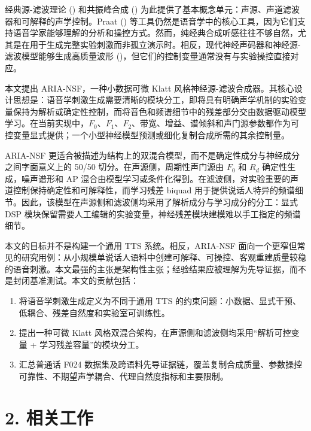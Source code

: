经典源-滤波理论 ()
和共振峰合成 ()
为此提供了基本概念单元：声源、声道滤波器和可解释的声学控制。Praat
()
等工具仍然是语音学中的核心工具，因为它们支持语音学家能够理解的分析和操控方式。然而，纯经典合成听感往往不够自然，尤其是在用于生成完整实验刺激而非孤立演示时。相反，现代神经声码器和神经源-滤波模型能够生成高质量波形
()，但它们的控制变量通常没有与实验操控直接对应。

本文提出 ARIA-NSF，一种小数据可微 Klatt
风格神经源-滤波合成器。其核心设计思想是：语音学刺激生成需要清晰的模块分工，即将具有明确声学机制的实验变量保持为解析或确定性控制，而将音色和频谱细节中的残差部分交由数据驱动模型学习。在当前实现中，\(F_0\)、\(F_1\)、\(F_2\)、带宽、增益、谱倾斜和声门源参数都作为可控变量显式提供；一个小型神经模型预测或细化复制合成所需的其余控制量。

ARIA-NSF
更适合被描述为结构上的双混合模型，而不是确定性成分与神经成分之间字面意义上的
50/50 切分。在声源侧，周期性声门源由 \(F_0\) 和 \(R_d\)
确定性生成，噪声谱形和 AP
混合由模型学习或条件化得到。在滤波侧，对实验重要的声道控制保持确定性和可解释性，而学习残差
biquad
用于提供说话人特异的频谱细节。因此，该模型在声源侧和滤波侧均采用了解析成分与学习成分的分工：显式
DSP
模块保留需要人工编辑的实验变量，神经残差模块建模难以手工指定的频谱细节。

本文的目标并不是构建一个通用 TTS 系统。相反，ARIA-NSF
面向一个更窄但常见的研究用例：从小规模单说话人语料中创建可解释、可操控、客观重建质量较稳的语音刺激。本文最强的主张是架构性主张；经验结果应被理解为先导证据，而不是封闭基准测试。本文的贡献包括：

\begin{enumerate}
\def\labelenumi{\arabic{enumi}.}
\tightlist
\item
  将语音学刺激生成定义为不同于通用 TTS
  的约束问题：小数据、显式干预、低耦合、残差自然度和实验室可训练性。
\item
  提出一种可微 Klatt
  风格双混合架构，在声源侧和滤波侧均采用``解析可控变量 +
  学习残差容量''的模块分工。
\item
  汇总普通话 F024
  数据集及跨语料先导证据链，覆盖复制合成质量、参数操控可靠性、不期望声学耦合、代理自然度指标和主要限制。
\end{enumerate}

\section{2. 相关工作}\label{ux76f8ux5173ux5de5ux4f5c}

